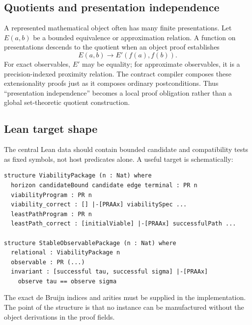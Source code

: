 \subsection{Quotients and presentation independence}

A represented mathematical object often has many finite presentations.  Let $E(a,b)$ be a bounded equivalence or approximation relation.  A function on presentations descends to the quotient when an object proof establishes
\[
  E(a,b)\longrightarrow E'(f(a),f(b)).
\]
For exact observables, $E'$ may be equality; for approximate observables, it is a precision-indexed proximity relation.  The contract compiler composes these extensionality proofs just as it composes ordinary postconditions.  Thus ``presentation independence'' becomes a local proof obligation rather than a global set-theoretic quotient construction.

\subsection{Lean target shape}

The central Lean data should contain bounded candidate and compatibility tests as fixed  symbols, not host predicates alone.  A useful target is schematically:

\begin{lstlisting}[language=Lean]
structure ViabilityPackage (n : Nat) where
  horizon candidateBound candidate edge terminal : PR n
  viabilityProgram : PR n
  viability_correct : [] |-[PRAAx] viabilitySpec ...
  leastPathProgram : PR n
  leastPath_correct : [initialViable] |-[PRAAx] successfulPath ...

structure StableObservablePackage (n : Nat) where
  relational : ViabilityPackage n
  observable : PR (...)
  invariant : [successful tau, successful sigma] |-[PRAAx]
    observe tau == observe sigma
\end{lstlisting}

The exact de Bruijn indices and arities must be supplied in the implementation.  The point of the structure is that no instance can be manufactured without the object derivations in the proof fields.
